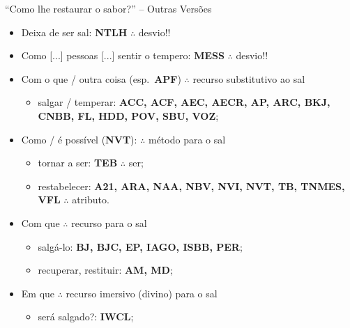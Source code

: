 \documentclass[12pt,aspectratio=169]{beamer}
\newcommand{\RED}[1]{{\textcolor{TXred}{#1}}}
\newcommand{\ORA}[1]{{\textcolor{TXora}{#1}}}
\newcommand{\YEL}[1]{{\textcolor{TXyel}{#1}}}
\newcommand{\MAG}[1]{{\textcolor{TXmag}{#1}}}
\newcommand{\BRI}[1]{{\textcolor{BSpbg}{#1}}}   %
\begin{document}
    \begin{frame}{\BRI{``Como lhe restaurar o sabor?''} -- Outras Versões}
        \begin{itemize}
            \item<1-> \RED{Deixa de ser sal}:
                \BRI{\textbf{NTLH}}
                $\therefore$ desvio!!
            \item<1-> \RED{Como [...] pessoas [...] sentir o tempero}:
                \BRI{\textbf{MESS}}
                $\therefore$ desvio!!
            \item<2-> \ORA{Com o que} / \ORA{outra coisa} (esp.~\BRI{\bf APF})
                $\therefore$ recurso substitutivo ao sal
                \begin{itemize}
                    \item \ORA{salgar} / \ORA{temperar}:
                        \BRI{\textbf{ACC, ACF, AEC, AECR, AP, ARC, BKJ, CNBB, FL, HDD, POV, SBU,
                            VOZ}};
                \end{itemize}
            \item<3-> \YEL{Como} / \YEL{é possível} (\BRI{\bf NVT}):
                $\therefore$ método para o sal
                \begin{itemize}
                    \item \YEL{tornar a ser}:
                        \BRI{\textbf{TEB}}
                        $\therefore$ ser;
                    \item \YEL{restabelecer}:
                        \BRI{\textbf{A21, ARA, NAA, NBV, NVI, NVT, TB, TNMES, VFL}}
                        $\therefore$ atributo.
                \end{itemize}
            \item<3-> \YEL{Com que}
                $\therefore$ recurso para o sal
                \begin{itemize}
                    \item \YEL{salgá-lo}:
                        \BRI{\textbf{BJ, BJC, EP, IAGO, ISBB, PER}};
                    \item \YEL{recuperar, restituir}:
                        \BRI{\textbf{AM, MD}};
                \end{itemize}
            \item<4-> \MAG{Em que}
                $\therefore$ recurso imersivo (divino) para o sal
                \begin{itemize}
                    \item \MAG{será salgado?}:
                        \BRI{\textbf{IWCL}};
                \end{itemize}
        \end{itemize}
    \end{frame}
\end{document}
